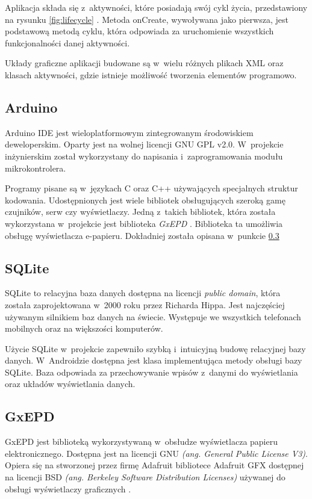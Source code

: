 \documentclass[a4paper,12pt, twoside]{article}
\begin{document}
    	Aplikacja składa się z~aktywności, które posiadają swój cykl życia, przedstawiony na rysunku \ref{fig:lifecycle} \cite{lifecycle}. Metoda onCreate, wywoływana jako pierwsza, jest podstawową metodą cyklu, która odpowiada za uruchomienie wszystkich funkcjonalności danej aktywności.
    	
    	Układy graficzne aplikacji budowane są w~wielu różnych plikach XML oraz klasach aktywności, gdzie istnieje możliwość tworzenia elementów programowo.
    	
    	\subsection{Arduino}
    	Arduino IDE jest wieloplatformowym zintegrowanym środowiskiem deweloperskim. Oparty jest na wolnej licencji GNU GPL v2.0. W~projekcie inżynierskim został wykorzystany do napisania i~zaprogramowania modułu mikrokontrolera.
    	
    	Programy pisane są w~językach C oraz C++ używających specjalnych struktur kodowania. Udostępnionych jest wiele bibliotek obsługujących szeroką gamę czujników, serw czy wyświetlaczy. Jedną z~takich bibliotek, która została wykorzystana w~projekcie jest biblioteka \textit{GxEPD} \cite{gxepd}. Biblioteka ta umożliwia obsługę wyświetlacza e-papieru. Dokładniej została opisana w~punkcie \ref{GxEPD}
    	
    	\subsection{SQLite}
    	SQLite to relacyjna baza danych dostępna na licencji \textit{public domain}\cite{publicdomain}, która została zaprojektowana w~2000 roku przez Richarda Hippa. Jest najczęściej używanym silnikiem baz danych na świecie. Występuje we wszystkich telefonach mobilnych oraz na większości komputerów. 
    	
    	Użycie SQLite w~projekcie zapewniło szybką i~intuicyjną budowę relacyjnej bazy danych. W~Androidzie dostępna jest klasa implementująca metody obsługi bazy SQLite. Baza odpowiada za przechowywanie wpisów z~danymi do wyświetlania oraz układów wyświetlania danych. 
    	
    	\subsection{GxEPD}\label{GxEPD}
    	GxEPD jest biblioteką wykorzystywaną w~obsłudze wyświetlacza papieru elektronicznego. Dostępna jest na licencji GNU \textit{(ang. General Public License V3)}. Opiera się na stworzonej przez firmę Adafruit bibliotece Adafruit GFX dostępnej na licencji BSD \textit{(ang. Berkeley Software Distribution Licenses)} używanej do obsługi wyświetlaczy graficznych \cite{adafruit}. 
    	
\end{document}
